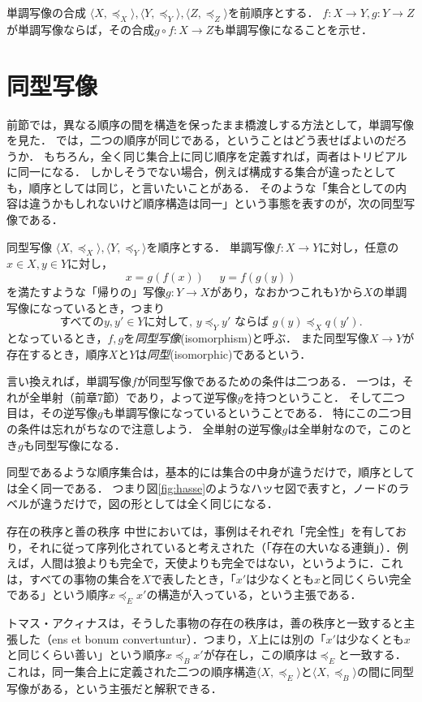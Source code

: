 \documentclass[dvipdfmx,11pt,a4paper]{jsarticle}
\begin{document}
\begin{renshu}{単調写像の合成}{}
$\langle X, \preceq_X \rangle, \langle Y, \preceq_Y \rangle, \langle Z, \preceq_Z \rangle$を前順序とする．
$f:X \to Y, g:Y \to Z$が単調写像ならば，その合成$g \circ f: X \to Z$も単調写像になることを示せ． 
\end{renshu}


\section{同型写像}
前節では，異なる順序の間を構造を保ったまま橋渡しする方法として，単調写像を見た．
では，二つの順序が同じである，ということはどう表せばよいのだろうか．
もちろん，全く同じ集合上に同じ順序を定義すれば，両者はトリビアルに同一になる．
しかしそうでない場合，例えば構成する集合が違ったとしても，順序としては同じ，と言いたいことがある．
そのような「集合としての内容は違うかもしれないけど順序構造は同一」という事態を表すのが，次の同型写像である．

\begin{dfn}{同型写像}{}
$\langle X, \preceq_X \rangle, \langle Y, \preceq_Y \rangle$を順序とする．
単調写像$f:X \to Y$に対し，任意の$x \in X, y \in Y$に対し，
\[
 x = g(f(x)) \ \ \ \ \ \ y = f(g(y))
\]
を満たすような「帰りの」写像$g:Y \to X$があり，なおかつこれも$Y$から$X$の単調写像になっているとき，つまり
\[
 \text{すべての}y, y' \in Y \text{に対して, }  y \preceq_Y y' \text{ ならば } g(y) \preceq_X q(y').
\]
となっているとき，$f, g$を\emph{同型写像}(isomorphism)と呼ぶ．
また同型写像$X \to Y$が存在するとき，順序$X$と$Y$は\emph{同型}(isomorphic)であるという．
\end{dfn}
言い換えれば，単調写像$f$が同型写像であるための条件は二つある．
一つは，それが全単射（前章7節）であり，よって逆写像$g$を持つということ．
そして二つ目は，その逆写像$g$も単調写像になっているということである．
特にこの二つ目の条件は忘れがちなので注意しよう．
全単射の逆写像$g$は全単射なので，このとき$g$も同型写像になる．

同型であるような順序集合は，基本的には集合の中身が違うだけで，順序としては全く同一である．
つまり図\ref{fig:hasse}のようなハッセ図で表すと，ノードのラベルが違うだけで，図の形としては全く同じになる．


\begin{rei}{存在の秩序と善の秩序}{}
  中世においては，事例はそれぞれ「完全性」を有しており，それに従って序列化されていると考えされた（「存在の大いなる連鎖」）．例えば，人間は狼よりも完全で，天使よりも完全ではない，というように．これは，すべての事物の集合を$X$で表したとき，「$x'$は少なくとも$x$と同じくらい完全である」という順序$x \preceq_E x'$の構造が入っている，という主張である．
  
  トマス・アクィナスは，そうした事物の存在の秩序は，善の秩序と一致すると主張した（ens et bonum convertuntur）．つまり，$X$上には別の「$x'$は少なくとも$x$と同じくらい善い」という順序$x \preceq_B x'$が存在し，この順序は$\preceq_E$と一致する．
  これは，同一集合上に定義された二つの順序構造$\langle X, \preceq_E \rangle$と$\langle X, \preceq_B \rangle$の間に同型写像がある，という主張だと解釈できる．
\end{rei}  
\end{document}
